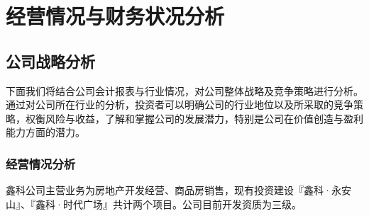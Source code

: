 
\chapter{经营情况与财务状况分析}
\label{chap02}

\section{公司战略分析}

下面我们将结合公司会计报表与行业情况，对公司整体战略及竞争策略进行分析。通过对公司所在行业的分析，投资者可以明确公司的行业地位以及所采取的竞争策略，权衡风险与收益，了解和掌握公司的发展潜力，特别是公司在价值创造与盈利能力方面的潜力。

\subsection{经营情况分析}

鑫科公司主营业务为房地产开发经营、商品房销售，现有投资建设『鑫科·永安山』、『鑫科·时代广场』共计两个项目。公司目前开发资质为三级。

